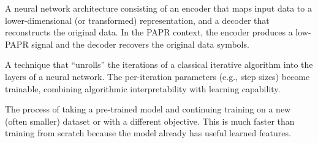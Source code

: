\begin{description}[style=nextline, font=\normalfont\bfseries, leftmargin=1.5em]
    \item[Autoencoder]
    A neural network architecture consisting of an encoder that maps
    input data to a lower-dimensional (or transformed) representation,
    and a decoder that reconstructs the original data.  In the PAPR
    context, the encoder produces a low-PAPR signal and the decoder
    recovers the original data symbols.

    \item[Deep Unfolding]
    A technique that ``unrolls'' the iterations of a classical
    iterative algorithm into the layers of a neural network.  The
    per-iteration parameters (e.g., step sizes) become trainable,
    combining algorithmic interpretability with learning capability.

    \item[Fine-Tuning]
    The process of taking a pre-trained model and continuing training
    on a new (often smaller) dataset or with a different objective.
    This is much faster than training from scratch because the model
    already has useful learned features.

\end{description}

